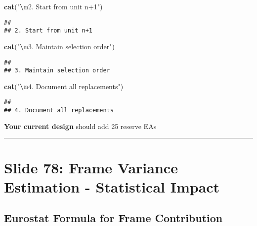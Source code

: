 \documentclass[
]{article}
\newenvironment{Shaded}{\begin{snugshade}}{\end{snugshade}}
\newcommand{\FunctionTok}[1]{\textcolor[rgb]{0.13,0.29,0.53}{\textbf{#1}}}
\newcommand{\NormalTok}[1]{#1}
\newcommand{\SpecialCharTok}[1]{\textcolor[rgb]{0.81,0.36,0.00}{\textbf{#1}}}
\newcommand{\StringTok}[1]{\textcolor[rgb]{0.31,0.60,0.02}{#1}}
\begin{document}
\begin{Shaded}
\begin{Highlighting}[]
\FunctionTok{cat}\NormalTok{(}\StringTok{"}\SpecialCharTok{\textbackslash{}n}\StringTok{2. Start from unit n+1"}\NormalTok{)}
\end{Highlighting}
\end{Shaded}

\begin{verbatim}
## 
## 2. Start from unit n+1
\end{verbatim}

\begin{Shaded}
\begin{Highlighting}[]
\FunctionTok{cat}\NormalTok{(}\StringTok{"}\SpecialCharTok{\textbackslash{}n}\StringTok{3. Maintain selection order"}\NormalTok{)}
\end{Highlighting}
\end{Shaded}

\begin{verbatim}
## 
## 3. Maintain selection order
\end{verbatim}

\begin{Shaded}
\begin{Highlighting}[]
\FunctionTok{cat}\NormalTok{(}\StringTok{"}\SpecialCharTok{\textbackslash{}n}\StringTok{4. Document all replacements"}\NormalTok{)}
\end{Highlighting}
\end{Shaded}

\begin{verbatim}
## 
## 4. Document all replacements
\end{verbatim}

\textbf{Your current design} should add 25 reserve EAs

\begin{center}\rule{0.5\linewidth}{0.5pt}\end{center}

\section{Slide 78: Frame Variance Estimation - Statistical
Impact}\label{slide-78-frame-variance-estimation---statistical-impact}

\subsection{Eurostat Formula for Frame
Contribution}\label{eurostat-formula-for-frame-contribution}
\end{document}
